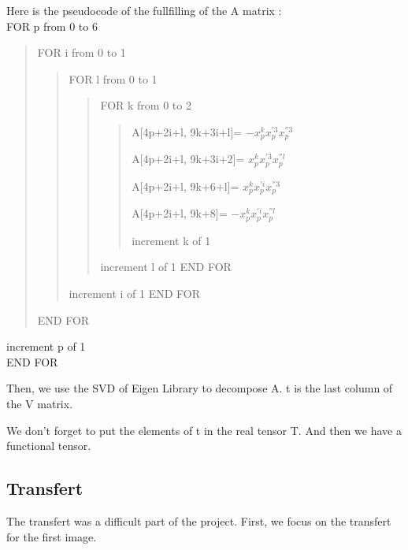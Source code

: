 \documentclass{report}
\begin{document}
Here is the pseudocode of the fullfilling of the A matrix : 
\\FOR p from 0 to 6
	\begin{verse}
	FOR i from 0 to 1
		\begin{verse}
		FOR l from 0 to 1
			\begin{verse}
			FOR k from 0 to 2
\begin{verse}
\begin{list}{•}{•}
\item 
A[4p+2i+l, 9k+3i+l]= $-x_{p}^{k}x_{p}^{'3}x_{p}^{''3}$
\item 
A[4p+2i+l, 9k+3i+2]= $x_{p}^{k}x_{p}^{'3}x_{p}^{''l}$
\item 
A[4p+2i+l, 9k+6+l]=  $x_{p}^{k}x_{p}^{'i}x_{p}^{''3}$
\item 
A[4p+2i+l, 9k+8]=    $-x_{p}^{k}x_{p}^{'i}x_{p}^{''l}$
\end{list}

increment k of 1
\end{verse}
				increment l of 1
			END FOR
			\end{verse}
			increment i of 1		
		END FOR
		\end{verse}	
	END FOR
	\end{verse}
increment p of 1 
\\END FOR

Then, we use the SVD of Eigen Library to decompose A. t is the last column of the V matrix. 

We don't forget to put the elements of t in the real tensor T. And then we have a functional tensor. 

\subsection{Transfert}
The transfert was a difficult part of the project. First, we focus on the transfert for the first image. 
\end{document}
